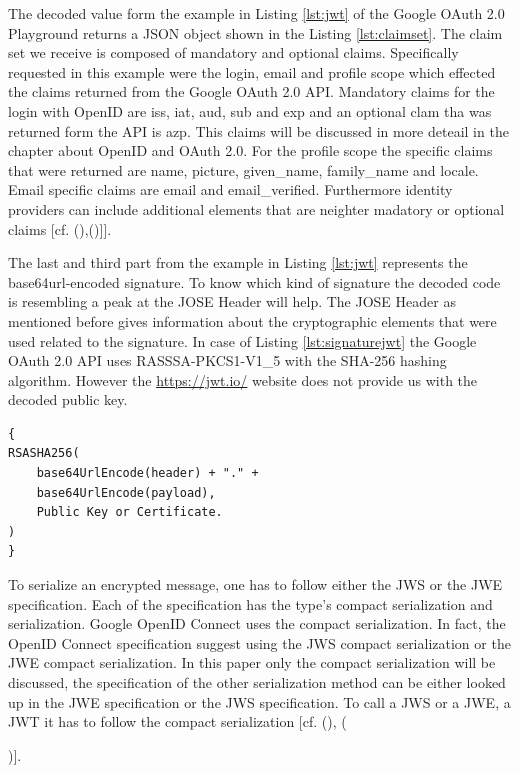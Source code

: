 {{The decoded value form the example in Listing \ref{lst:jwt} of the Google OAuth 2.0 Playground \cite{Google:2018:OAuthPlayground} returns a JSON object shown in the Listing \ref{lst:claimset}. The claim set we receive is composed of mandatory and optional claims. Specifically requested in this example were the login, email and profile scope which effected the claims returned from the Google OAuth 2.0 API. Mandatory claims for the login with OpenID are iss, iat, aud, sub and exp and an optional clam tha was returned form the API is azp. This claims will be discussed in more deteail in the chapter about OpenID and OAuth 2.0. For the profile scope the specific claims that were returned are name, picture, given\_name, family\_name and locale. Email specific claims are email and email\_verified. Furthermore identity providers can include additional elements that are neighter madatory or optional claims [cf. ({\cite{Google:2018:OAuthPlayground}),(\cite{Siriwardena:JWTJWSJWE:2016})]}].

The last and third part from the example in  Listing \ref{lst:jwt}  represents the base64url-encoded signature. To know which kind of signature the decoded code is resembling a peak at the JOSE Header will help. The JOSE Header as mentioned before gives information about the cryptographic elements that were used related to the signature. In case of Listing \ref{lst:signaturejwt} the Google OAuth 2.0 API uses RASSSA-PKCS1-V1\_5 with the SHA-256 hashing algorithm. However the \href{https://jwt.io/} {https://jwt.io/} website does not provide us with the decoded public key. 

\begin{lstlisting}
{
RSASHA256(
	base64UrlEncode(header) + "." +
	base64UrlEncode(payload),
	Public Key or Certificate.
)
}
\end{lstlisting}


To serialize an encrypted message, one has to follow either the JWS or the JWE specification. Each of the specification has the type’s compact serialization and serialization. Google OpenID Connect uses the compact serialization. In fact, the OpenID Connect specification suggest using the JWS compact serialization or the JWE compact serialization. In this paper only the compact serialization will be discussed, the specification of the other serialization method can be either looked up in the JWE specification or the JWS specification. To call a JWS or a JWE, a JWT it has to follow the compact serialization [cf. (\cite{JWS:IETF:Jones:2015}), ({\cite{JWE:IETF:Jones:2015})].
	
}}}
